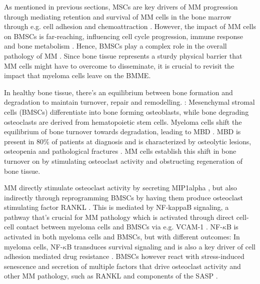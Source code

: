 %
\label{sec:intro_myeloma_hMSC_interactions}%
As mentioned in previous sections, \acp{MSC} are key drivers of \ac{MM}
progression through mediating retention and survival of \ac{MM} cells in the
bone marrow through e.g. cell adhesion and chemoattraction
\cite{zeissigTumourDisseminationMultiple2020}. However, the impact of \ac{MM}
cells on \acp{BMSC} is far-reaching, influencing cell cycle
progression, immune response and bone metabolism
\cite{dotterweichContactMyelomaCells2016,
    fernandoTranscriptomeAnalysisMesenchymal2019}. Hence, \acp{BMSC} play a complex
role in the overall pathology of \ac{MM} \cite{mangoliniBoneMarrowStromal2020}.
Since bone tissue represents a sturdy physical barrier that \ac{MM} cells might
have to overcome to disseminate, it is crucial to revisit the impact that
myeloma cells leave on the \ac{BMME}.

In healthy bone tissue, there's an equilibrium between bone formation and
degradation to maintain turnover, repair and remodelling.
\cite{vaananenMechanismBoneTurnover1993}: Mesenchymal stromal cells (BMSCs)
differentiate into bone forming osteoblasts, while bone degrading osteoclasts
are derived from hematopoietic stem cells. Myeloma cells shift the equilibrium
of bone turnover towards degradation, leading to \ac{MBD}
\cite{hideshimaUnderstandingMultipleMyeloma2007}. MBD is present in 80\% of
patients at diagnosis and is characterized by osteolytic lesions, osteopenia and
pathological fractures \cite{terposPathogenesisBoneDisease2018}. \ac{MM} cells
establish this shift in bone turnover on by stimulating osteoclast activity and
obstructing regeneration of bone tissue.

\ac{MM} directly stimulate osteoclast activity by secreting \ac{MIP1alpha}
\cite{obaMIP1alphaUtilizesBoth2005}, but also indirectly through reprogramming
\acp{BMSC} by having them produce osteoclast stimulating factor \ac{RANKL}
\cite{tsubakiHGFMetNFkB2020}. This is mediated by \ac{NF-kappaB} signaling, a
pathway that's crucial for MM pathology which is activated through direct
cell-cell contact between myeloma cells and \acp{BMSC} via e.g. \ac{VCAM-1}
\cite{cippitelliRoleNFkBSignaling2023, royNFkBActivatingPathways2018}.
NF-$\kappa$B is activated in both myeloma cells and \acp{BMSC}, but with
different outcomes: In myeloma cells, NF-$\kappa$B transduces survival signaling
and is also a key driver of cell adhesion mediated drug resistance
\cite{royNoncanonicalNFkBMutations2017, landowskiCellAdhesionmediatedDrug2003}.
\acp{BMSC} however react with stress-induced senescence and secretion of
multiple factors that drive osteoclast activity and other \ac{MM} pathology,
such as RANKL and components of the \ac{SASP}
\cite{chauhanMultipleMyelomaCell1996, fairfieldMultipleMyelomaCells2020}.


